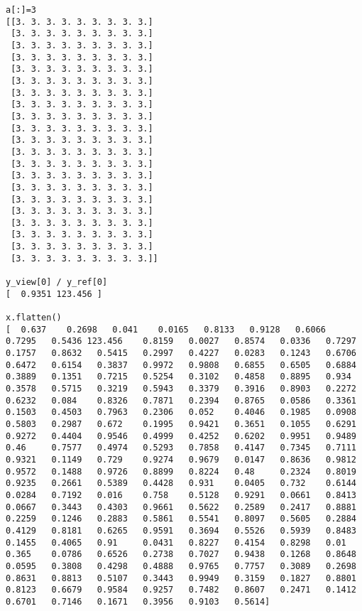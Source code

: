 \begin{verbatim}
a[:]=3
[[3. 3. 3. 3. 3. 3. 3. 3. 3.]
 [3. 3. 3. 3. 3. 3. 3. 3. 3.]
 [3. 3. 3. 3. 3. 3. 3. 3. 3.]
 [3. 3. 3. 3. 3. 3. 3. 3. 3.]
 [3. 3. 3. 3. 3. 3. 3. 3. 3.]
 [3. 3. 3. 3. 3. 3. 3. 3. 3.]
 [3. 3. 3. 3. 3. 3. 3. 3. 3.]
 [3. 3. 3. 3. 3. 3. 3. 3. 3.]
 [3. 3. 3. 3. 3. 3. 3. 3. 3.]
 [3. 3. 3. 3. 3. 3. 3. 3. 3.]
 [3. 3. 3. 3. 3. 3. 3. 3. 3.]
 [3. 3. 3. 3. 3. 3. 3. 3. 3.]
 [3. 3. 3. 3. 3. 3. 3. 3. 3.]
 [3. 3. 3. 3. 3. 3. 3. 3. 3.]
 [3. 3. 3. 3. 3. 3. 3. 3. 3.]
 [3. 3. 3. 3. 3. 3. 3. 3. 3.]
 [3. 3. 3. 3. 3. 3. 3. 3. 3.]
 [3. 3. 3. 3. 3. 3. 3. 3. 3.]
 [3. 3. 3. 3. 3. 3. 3. 3. 3.]
 [3. 3. 3. 3. 3. 3. 3. 3. 3.]
 [3. 3. 3. 3. 3. 3. 3. 3. 3.]]

y_view[0] / y_ref[0]
[  0.9351 123.456 ]

x.flatten()
[  0.637    0.2698   0.041    0.0165   0.8133   0.9128   0.6066   0.7295   0.5436 123.456    0.8159   0.0027   0.8574   0.0336   0.7297   0.1757   0.8632   0.5415   0.2997   0.4227   0.0283   0.1243   0.6706   0.6472   0.6154   0.3837   0.9972   0.9808   0.6855   0.6505   0.6884   0.3889   0.1351   0.7215   0.5254   0.3102   0.4858   0.8895   0.934    0.3578   0.5715   0.3219   0.5943   0.3379   0.3916   0.8903   0.2272   0.6232   0.084    0.8326   0.7871   0.2394   0.8765   0.0586   0.3361   0.1503   0.4503   0.7963   0.2306   0.052    0.4046   0.1985   0.0908   0.5803   0.2987   0.672    0.1995   0.9421   0.3651   0.1055   0.6291   0.9272   0.4404   0.9546   0.4999   0.4252   0.6202   0.9951   0.9489   0.46     0.7577   0.4974   0.5293   0.7858   0.4147   0.7345   0.7111   0.9321   0.1149   0.729    0.9274   0.9679   0.0147   0.8636   0.9812   0.9572   0.1488   0.9726   0.8899   0.8224   0.48     0.2324   0.8019   0.9235   0.2661   0.5389   0.4428   0.931    0.0405   0.732    0.6144   0.0284   0.7192   0.016    0.758    0.5128   0.9291   0.0661   0.8413   0.0667   0.3443   0.4303   0.9661   0.5622   0.2589   0.2417   0.8881   0.2259   0.1246   0.2883   0.5861   0.5541   0.8097   0.5605   0.2884   0.4129   0.8181   0.6265   0.9591   0.3694   0.5526   0.5939   0.8483   0.1455   0.4065   0.91     0.0431   0.8227   0.4154   0.8298   0.01     0.365    0.0786   0.6526   0.2738   0.7027   0.9438   0.1268   0.8648   0.0595   0.3808   0.4298   0.4888   0.9765   0.7757   0.3089   0.2698   0.8631   0.8813   0.5107   0.3443   0.9949   0.3159   0.1827   0.8801   0.8123   0.6679   0.9584   0.9257   0.7482   0.8607   0.2471   0.1412   0.6701   0.7146   0.1671   0.3956   0.9103   0.5614]


\end{verbatim}
